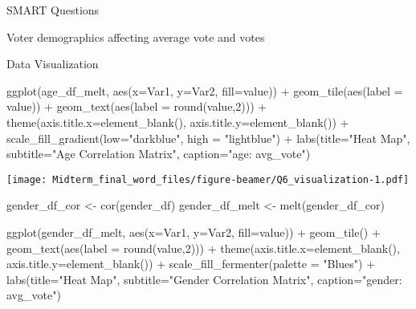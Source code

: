 \documentclass[
  ignorenonframetext,
]{beamer}
\newenvironment{Shaded}{\begin{snugshade}}{\end{snugshade}}
\newcommand{\AttributeTok}[1]{\textcolor[rgb]{0.77,0.63,0.00}{#1}}
\newcommand{\DecValTok}[1]{\textcolor[rgb]{0.00,0.00,0.81}{#1}}
\newcommand{\FunctionTok}[1]{\textcolor[rgb]{0.00,0.00,0.00}{#1}}
\newcommand{\NormalTok}[1]{#1}
\newcommand{\OtherTok}[1]{\textcolor[rgb]{0.56,0.35,0.01}{#1}}
\newcommand{\SpecialCharTok}[1]{\textcolor[rgb]{0.00,0.00,0.00}{#1}}
\newcommand{\StringTok}[1]{\textcolor[rgb]{0.31,0.60,0.02}{#1}}
\begin{document}
\begin{frame}[fragile]{SMART Questions}
\begin{block}{Voter demographics affecting average vote and votes}
\begin{block}{Data Visualization}
\begin{Shaded}
\begin{Highlighting}[]
\FunctionTok{ggplot}\NormalTok{(age\_df\_melt, }\FunctionTok{aes}\NormalTok{(}\AttributeTok{x=}\NormalTok{Var1, }\AttributeTok{y=}\NormalTok{Var2, }\AttributeTok{fill=}\NormalTok{value)) }\SpecialCharTok{+} 
  \FunctionTok{geom\_tile}\NormalTok{(}\FunctionTok{aes}\NormalTok{(}\AttributeTok{label =}\NormalTok{ value)) }\SpecialCharTok{+}
    \FunctionTok{geom\_text}\NormalTok{(}\FunctionTok{aes}\NormalTok{(}\AttributeTok{label =} \FunctionTok{round}\NormalTok{(value,}\DecValTok{2}\NormalTok{))) }\SpecialCharTok{+}
      \FunctionTok{theme}\NormalTok{(}\AttributeTok{axis.title.x=}\FunctionTok{element\_blank}\NormalTok{(), }\AttributeTok{axis.title.y=}\FunctionTok{element\_blank}\NormalTok{()) }\SpecialCharTok{+}
        \FunctionTok{scale\_fill\_gradient}\NormalTok{(}\AttributeTok{low=}\StringTok{"darkblue"}\NormalTok{, }\AttributeTok{high =} \StringTok{"lightblue"}\NormalTok{) }\SpecialCharTok{+}
          \FunctionTok{labs}\NormalTok{(}\AttributeTok{title=}\StringTok{"Heat Map"}\NormalTok{,}
              \AttributeTok{subtitle=}\StringTok{"Age Correlation Matrix"}\NormalTok{,}
              \AttributeTok{caption=}\StringTok{"age: avg\_vote"}\NormalTok{)}
\end{Highlighting}
\end{Shaded}

\texttt{[image: Midterm\_final\_word\_files/figure-beamer/Q6\_visualization-1.pdf]}

\begin{Shaded}
\begin{Highlighting}[]
\NormalTok{gender\_df\_cor }\OtherTok{\textless{}{-}} \FunctionTok{cor}\NormalTok{(gender\_df)}
\NormalTok{gender\_df\_melt }\OtherTok{\textless{}{-}} \FunctionTok{melt}\NormalTok{(gender\_df\_cor)}

\FunctionTok{ggplot}\NormalTok{(gender\_df\_melt, }\FunctionTok{aes}\NormalTok{(}\AttributeTok{x=}\NormalTok{Var1, }\AttributeTok{y=}\NormalTok{Var2, }\AttributeTok{fill=}\NormalTok{value)) }\SpecialCharTok{+} 
  \FunctionTok{geom\_tile}\NormalTok{() }\SpecialCharTok{+}
    \FunctionTok{geom\_text}\NormalTok{(}\FunctionTok{aes}\NormalTok{(}\AttributeTok{label =} \FunctionTok{round}\NormalTok{(value,}\DecValTok{2}\NormalTok{))) }\SpecialCharTok{+}
      \FunctionTok{theme}\NormalTok{(}\AttributeTok{axis.title.x=}\FunctionTok{element\_blank}\NormalTok{(), }\AttributeTok{axis.title.y=}\FunctionTok{element\_blank}\NormalTok{()) }\SpecialCharTok{+}
        \FunctionTok{scale\_fill\_fermenter}\NormalTok{(}\AttributeTok{palette =} \StringTok{"Blues"}\NormalTok{) }\SpecialCharTok{+}
          \FunctionTok{labs}\NormalTok{(}\AttributeTok{title=}\StringTok{"Heat Map"}\NormalTok{,}
              \AttributeTok{subtitle=}\StringTok{"Gender Correlation Matrix"}\NormalTok{,}
              \AttributeTok{caption=}\StringTok{"gender: avg\_vote"}\NormalTok{)}
\end{Highlighting}
\end{Shaded}


\end{block}
\end{block}
\end{frame}
\end{document}
